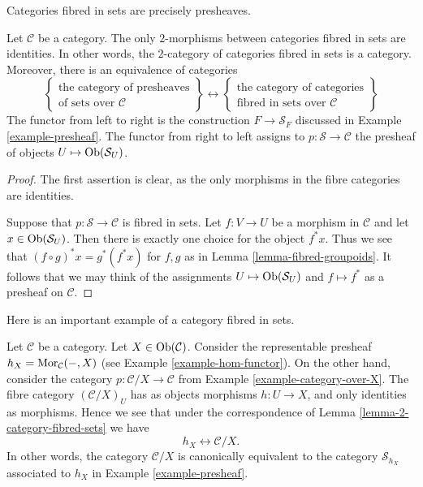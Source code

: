 \begin{lemma}
\label{lemma-2-category-fibred-sets}
\begin{slogan}
Categories fibred in sets are precisely presheaves.
\end{slogan}
Let $\mathcal{C}$ be a category.
The only $2$-morphisms between categories fibred in sets are identities.
In other words, the $2$-category of categories fibred in sets is a category.
Moreover, there is an equivalence of categories
$$
\left\{
\begin{matrix}
\text{the category of presheaves}\\
\text{of sets over }\mathcal{C}
\end{matrix}
\right\}
\leftrightarrow
\left\{
\begin{matrix}
\text{the category of categories}\\
\text{fibred in sets over }\mathcal{C}
\end{matrix}
\right\}
$$
The functor from left to right is the construction
$F \to \mathcal{S}_F$ discussed in
Example \ref{example-presheaf}.
The functor from right to left assigns to $p : \mathcal{S} \to \mathcal{C}$
the presheaf of objects $U \mapsto \mathop{\mathrm{Ob}}\nolimits(\mathcal{S}_U)$.
\end{lemma}

\begin{proof}
The first assertion is clear, as the only morphisms in the fibre
categories are identities.

\medskip\noindent
Suppose that $p :
\mathcal{S} \to \mathcal{C}$ is fibred in sets. Let $f : V \to U$
be a morphism in $\mathcal{C}$ and let $x \in \mathop{\mathrm{Ob}}\nolimits(\mathcal{S}_U)$.
Then there is exactly one choice for the object $f^\ast x$. Thus we see that
$(f \circ g)^\ast x = g^\ast(f^\ast x)$ for $f, g$ as in Lemma
\ref{lemma-fibred-groupoids}. It follows that we may think of the
assignments $U \mapsto \mathop{\mathrm{Ob}}\nolimits(\mathcal{S}_U)$ and $f \mapsto f^\ast$
as a presheaf on $\mathcal{C}$.
\end{proof}

\noindent
Here is an important example of a category fibred in sets.

\begin{example}
\label{example-fibred-category-from-functor-of-points}
Let $\mathcal{C}$ be a category. Let $X \in \mathop{\mathrm{Ob}}\nolimits(\mathcal{C})$.
Consider the representable presheaf $h_X = \mathop{\mathrm{Mor}}\nolimits_\mathcal{C}(-, X)$
(see Example \ref{example-hom-functor}).
On the other hand, consider the category $p : \mathcal{C}/X \to \mathcal{C}$
from Example \ref{example-category-over-X}.
The fibre category $(\mathcal{C}/X)_U$ has as objects morphisms
$h : U \to X$, and only identities as morphisms. Hence we see that
under the correspondence of
Lemma \ref{lemma-2-category-fibred-sets}
we have
$$
h_X \longleftrightarrow \mathcal{C}/X.
$$
In other words, the category $\mathcal{C}/X$ is canonically equivalent
to the category $\mathcal{S}_{h_X}$ associated
to $h_X$ in
Example \ref{example-presheaf}.
\end{example}

